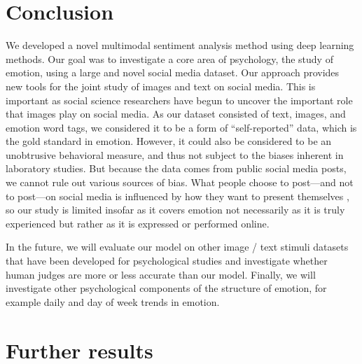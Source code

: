 \documentclass{article} %
\begin{document}
\section{Conclusion}
We developed a novel multimodal sentiment analysis method using deep learning methods. Our goal was to investigate a core area of psychology, the study of emotion, using a large and novel social media dataset. Our approach provides new tools for the joint study of images and text on social media. This is important as social science researchers have begun to uncover the important role that images play on social media. As our dataset consisted of text, images, and emotion word tags, we considered it to be a form of ``self-reported'' data, which is the gold standard in emotion. However, it could also be considered to be an unobtrusive behavioral measure, and thus not subject to the biases inherent in laboratory studies. 
But because the data comes from public social media posts, we cannot rule out various sources of bias. What people choose to post---and not to post---on social media is influenced by how they want to present themselves \citep{wojnicki2008word}, so our study is limited insofar as it covers emotion not necessarily as it is truly experienced but rather as it is expressed or performed online. 

In the future, we will evaluate our model on other image / text stimuli datasets that have been developed for psychological studies and investigate whether human judges are more or less accurate than our model. Finally, we will investigate other psychological components of the structure of emotion, for example daily and day of week trends in emotion.





\newpage
\appendix

\section{Further results}
\end{document}

